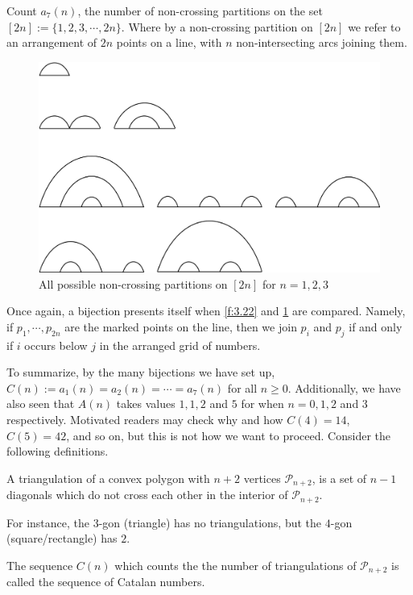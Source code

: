 \begin{question}
Count $a_7(n)$, the number of non-crossing partitions on the set $[2n]:=\{1,2,3,\cdots,2n\}$. Where by a non-crossing partition on $[2n]$ we refer to an arrangement of $2n$ points on a line, with $n$ non-intersecting arcs joining them.    
\end{question}
\begin{solution}
\begin{figure}[H]
    \centering
    \includegraphics[width=0.8\linewidth]{Images/Figure15.png}
    \caption{All possible non-crossing partitions on $[2n]$ for $n=1,2,3$}
    \label{f:3.25}
\end{figure}
Once again, a bijection presents itself when \cref{f:3.22} and \cref{f:3.25} are compared. Namely, if $p_1,\cdots,p_{2n}$ are the marked points on the line, then we join $p_i$ and $p_j$ if and only if $i$ occurs below $j$ in the arranged grid of numbers.    
\end{solution}
To summarize, by the many bijections we have set up, $C(n):=a_1(n)=a_2(n)=\cdots=a_7(n)$ for all $n\geq 0$. Additionally, we have also seen that $A(n)$ takes values $1,1,2$ and $5$ for when $n=0,1,2$ and $3$ respectively. Motivated readers may check why and how $C(4)=14$, $C(5)=42$, and so on, but this is not how we want to proceed. Consider the following definitions.
\begin{definition}[Triangulation]
A triangulation of a convex polygon with $n+2$ vertices $\mathcal{P}_{n+2}$, is a set of $n-1$ diagonals which do not cross each other in the interior of $\mathcal{P}_{n+2}$. 
\end{definition}
\begin{remark}
For instance, the $3$-gon (triangle) has no triangulations, but the $4$-gon (square/rectangle) has $2$.    
\end{remark}
\begin{definition}
The sequence $C(n)$ which counts the the number of triangulations of $\mathcal{P}_{n+2}$ is called the sequence of Catalan numbers.
\label{d:catalan}
\end{definition}
